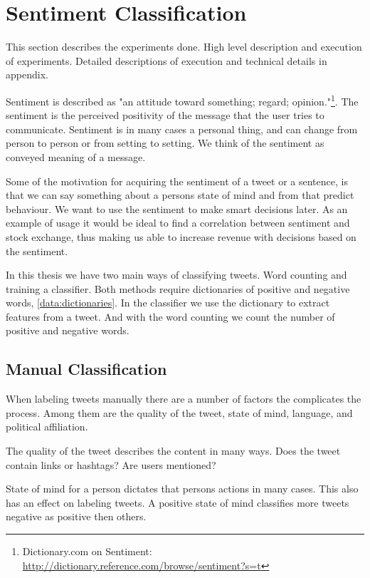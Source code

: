 
\chapter{Sentiment Classification}
This section describes the experiments done. High level description and
execution of experiments. Detailed descriptions of execution and technical
details in appendix. 

Sentiment is described as "an attitude toward something; regard;
opinion."\footnote{ Dictionary.com on Sentiment:
\url{http://dictionary.reference.com/browse/sentiment?s=t}}. The sentiment is the perceived positivity of the message that the user tries to
communicate. Sentiment is in many cases a personal thing, and can change from
person to person or from setting to setting. We think of the sentiment as
conveyed meaning of a message. 

Some of the motivation for acquiring the sentiment of a tweet or a sentence, is
that we can say something about a persons state of mind and from that predict
behaviour. We want to use the sentiment to make smart decisions later. As an
example of usage it would be ideal to find a correlation between sentiment and
stock exchange, thus making us able to increase revenue with decisions
based on the sentiment. 

In this thesis we have two main ways of classifying tweets. Word counting and
training a classifier. Both methods require dictionaries of positive and
negative words, \ref{data:dictionaries}. In the classifier we use the dictionary
to extract features from a tweet. And with the word counting we count the
number of positive and negative words. 

\section{Manual Classification}\label{sentiment:manual_classification}
When labeling tweets manually there are a number of factors the complicates the
process. Among them are the quality of the tweet, state of mind, language, and
political affiliation.

The quality of the tweet describes the content in many ways. Does the tweet
contain links or hashtags? Are users mentioned?

State of mind for a person dictates that persons actions in many cases. This
also has an effect on labeling tweets. A positive state of mind classifies more
tweets negative as positive then others.

